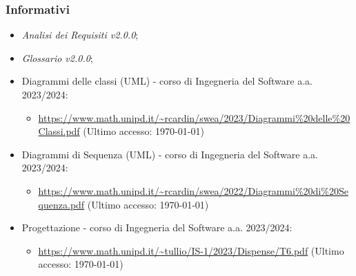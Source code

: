 \documentclass[8pt]{article}
\begin{document}
\subsubsection{Informativi}
\begin{itemize}
	\setlength\itemsep{0em}
    \item \textit{Analisi dei Requisiti v2.0.0};
    \item \textit{Glossario v2.0.0};
    \item Diagrammi delle classi (UML) - corso di Ingegneria del Software a.a. 2023/2024:
    \begin{itemize}
	\setlength\itemsep{0em}
        \item \href{https://www.math.unipd.it/~rcardin/swea/2023/Diagrammi%20delle%20Classi.pdf}{\color{myblue}https://www.math.unipd.it/\textasciitilde{}rcardin/swea/2023/Diagrammi\%20delle\%20Classi.pdf} (Ultimo accesso: \today)
    \end{itemize}
    \item Diagrammi di Sequenza (UML) - corso di Ingegneria del Software a.a. 2023/2024:
    \begin{itemize}
	\setlength\itemsep{0em}
        \item \href{https://www.math.unipd.it/~rcardin/swea/2022/Diagrammi%20di%20Sequenza.pdf}{\color{myblue}https://www.math.unipd.it/\textasciitilde{}rcardin/swea/2022/Diagrammi\%20di\%20Sequenza.pdf} (Ultimo accesso: \today)
    \end{itemize}
    \item Progettazione - corso di Ingegneria del Software a.a. 2023/2024:
    \begin{itemize}
	\setlength\itemsep{0em}
        \item \href{https://www.math.unipd.it/~tullio/IS-1/2023/Dispense/T6.pdf}{\color{myblue}https://www.math.unipd.it/\textasciitilde{}tullio/IS-1/2023/Dispense/T6.pdf} (Ultimo accesso: \today)
    \end{itemize}
\end{itemize}
\end{document}
